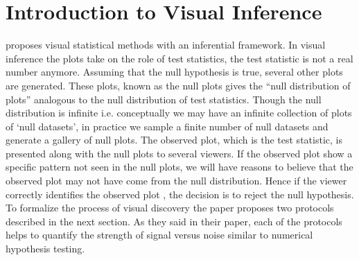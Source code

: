 

\section{Introduction to Visual Inference} \citet{buja:2009} proposes visual statistical methods with an inferential framework. In visual inference the plots take on the role of test statistics, the test statistic is not a real number anymore. Assuming that the null hypothesis is true, several other plots are generated. These plots, known as the null plots gives the ``null distribution of plots'' analogous to the null distribution of test statistics. Though the null distribution is infinite i.e. conceptually we may have an infinite collection of plots of `null datasets', in practice we sample a finite number of null datasets and generate a gallery of null plots. The observed plot, which is the test statistic, is presented along with the null plots to several viewers. If the observed plot show a specific pattern not seen in the null plots, we will have reasons to believe that the observed plot may not have come from the null distribution. Hence if the viewer correctly identifies the observed plot , the decision is to reject the null hypothesis. To formalize the process of visual discovery the paper proposes two protocols described in the next section. As they said in their paper, each of the protocols helps to quantify the strength of signal versus noise similar to numerical hypothesis testing. 

